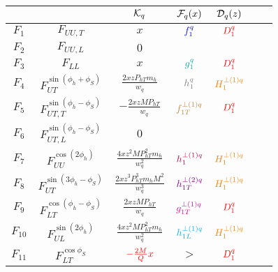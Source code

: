\documentclass[floatfix,aps,prd,nofootinbib,superscriptaddress,preprint]{revtex4}
\newcommand\3[1]{\boldsymbol{#1}}
\newcommand{\Phperp}{P_{hT}}
\begin{document}
\begin{table}[h!]
\begin{tabular}{|c|c|c|c|c|c|c|}
\hline
         &                                     & ${\cal{K}}_q$                                                                               & ${\cal F}_q(x)$ & ${\cal D}_q(z)$ \\\hline
$F_1$    & $F_{UU,T}$                          & $x$                                                                                         & ${\color{blue} f_1^q}$          & ${\color{red} D_1^{q}} $          \\\hline
$F_2$    & $F_{UU,L}$                          & $0$                                                                                         &                 & \\\hline
$F_3$    & $F_{LL}$                            & $x$                                                                                         & $\ppdf$         & ${\color{red} D_1^{q}}$           \\\hline
$F_4$    & $F_{UT}^{\sin(\phi_h+\phi_S)}$      & $\frac{2 x z \Phperp  m_h}{w_q}$                                                            & $\transversity$ & ${\color{orange} H^{\perp(1)q}_{1} }$      \\\hline
$F_5$    & $F_{UT,T}^{\sin(\phi_h-\phi_S)}$    & $-\frac{2xzM \Phperp}{w_q}$                                                                 & ${\color{brown} f^{\perp(1)q}_{1T}}$       & ${\color{red} D_1^{q}}$           \\\hline
$F_6$    & $F_{UT,L}^{\sin(\phi_h-\phi_S)}$    & $0$                                                                                         &                 & \\\hline
$F_7$    & $F_{UU}^{\cos(2\phi_h)}$            & $\frac{4 x z^2 M \Phperp^2 m_h}{w_q^2} $                                                    & ${\color{purple} h^{\perp(1)q}_1 }$  & ${\color{orange} H^{\perp(1)q}_{1} } $     \\\hline
$F_8$    & $F_{UT}^{\sin(3\phi_h-\phi_S)}$     & $\frac{2 x z^3 \Phperp^3 m_h M^2}{w_q^3} $                                                 & ${\color{violet} h^{\perp(2)q}_{1T} }$ & ${\color{orange} H^{\perp(1)q}_{1} } $     \\\hline
$F_9$    & $F_{LT}^{\cos(\phi_h -\phi_S)}$     & $ \frac{2xzM\Phperp}{w_q} $                                                                 & ${\color{magenta} g^{\perp (1) q}_{1T}}$          & ${\color{red} D_1^{q}}$           \\\hline
$F_{10}$ & $F_{UL}^{\sin(2\phi_h)}$            & $ \frac{4 xz^2M \Phperp^2 m_h}{w_q^2} $                                                     & ${\color{cyan}h^{\perp (1) q}_{1L}}$          & ${\color{orange} H^{\perp(1)q}_{1} } $     \\\hline
$F_{11}$ & $F_{LT}^{\cos\phi_S}$               & $\color{red} -\frac{2M}{Q} x$           & $\gt$          & ${\color{red} D_1^{q}}$           \\\hline

\end{tabular}
\end{table}
\end{document}
